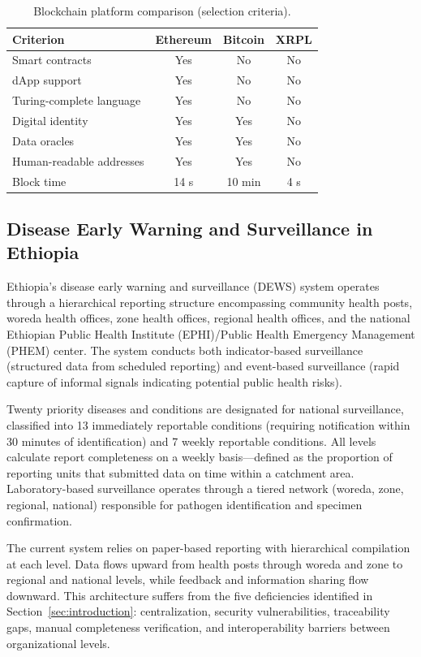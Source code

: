 \documentclass[AMA,LATO1COL]{WileyNJD-v2}
\begin{document}
\begin{table}[!ht]
\caption{Blockchain platform comparison (selection criteria).}\label{tab:platform}
\begin{tabular*}{\columnwidth}{@{\extracolsep\fill}lccc@{}}
\toprule
Criterion & Ethereum & Bitcoin & XRPL \\
\midrule
Smart contracts & Yes & No & No \\
dApp support & Yes & No & No \\
Turing-complete language & Yes & No & No \\
Digital identity & Yes & Yes & No \\
Data oracles & Yes & Yes & No \\
Human-readable addresses & Yes & Yes & No \\
Block time & 14 s & 10 min & 4 s \\
\bottomrule
\end{tabular*}
\end{table}

\subsection{Disease Early Warning and Surveillance in Ethiopia}\label{subsec:dews}

Ethiopia's disease early warning and surveillance (DEWS) system operates through a hierarchical reporting structure encompassing community health posts, woreda health offices, zone health offices, regional health offices, and the national Ethiopian Public Health Institute (EPHI)/Public Health Emergency Management (PHEM) center. The system conducts both indicator-based surveillance (structured data from scheduled reporting) and event-based surveillance (rapid capture of informal signals indicating potential public health risks).

Twenty priority diseases and conditions are designated for national surveillance, classified into 13 immediately reportable conditions (requiring notification within 30 minutes of identification) and 7 weekly reportable conditions. All levels calculate report completeness on a weekly basis---defined as the proportion of reporting units that submitted data on time within a catchment area. Laboratory-based surveillance operates through a tiered network (woreda, zone, regional, national) responsible for pathogen identification and specimen confirmation.

The current system relies on paper-based reporting with hierarchical compilation at each level. Data flows upward from health posts through woreda and zone to regional and national levels, while feedback and information sharing flow downward. This architecture suffers from the five deficiencies identified in Section~\ref{sec:introduction}: centralization, security vulnerabilities, traceability gaps, manual completeness verification, and interoperability barriers between organizational levels.
\end{document}
